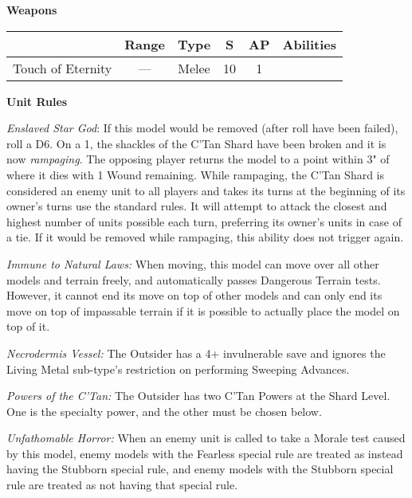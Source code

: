 \begin{minipage}[t]{0.72\textwidth}
	\vspace*{2em}
	\textbf{Weapons}
	
	\begin{tabular}{m{95 pt} *{4}{c} >{\raggedright\arraybackslash}p{130pt}}
		& Range & Type & S & AP & Abilities \\
		\hline
		Touch of Eternity & — & Melee & 10 & 1 & \quickref{Shroud of Despair} \\
	\end{tabular}
	
	\vspace*{2em}
	\textbf{Unit Rules}
	
	\textit{Enslaved Star God}: If this model would be removed (after  roll have been failed), roll a D6. On a 1, the shackles of the C'Tan Shard have been broken and it is now \textit{rampaging}. The opposing player returns the model to a point within 3" of where it dies with 1 Wound remaining. While rampaging, the C'Tan Shard is considered an enemy unit to all players and takes its turns at the beginning of its owner's turns use the standard rules. It will attempt to attack the closest and highest number of units possible each turn, preferring its owner's units in case of a tie. If it would be removed while rampaging, this ability does not trigger again.
	
	\textit{Immune to Natural Laws:} When moving, this model can move over all other models and terrain freely, and automatically passes Dangerous Terrain tests. However, it cannot end its move on top of other models and can only end its move on top of impassable terrain if it is possible to actually place the model on top of it.
	
	\textit{Necrodermis Vessel:} The Outsider has a 4+ invulnerable save and ignores the Living Metal sub-type's restriction on performing Sweeping Advances.
		
	\textit{Powers of the C'Tan:} The Outsider has two C'Tan Powers at the Shard Level. One is the  specialty power, and the other must be chosen below.
	
	\textit{Unfathomable Horror:} When an enemy unit is called to take a Morale test caused by this model, enemy models with the Fearless special rule are treated as instead having the Stubborn special rule, and enemy models with the Stubborn special rule are treated as not having that special rule.
	

\end{minipage}
